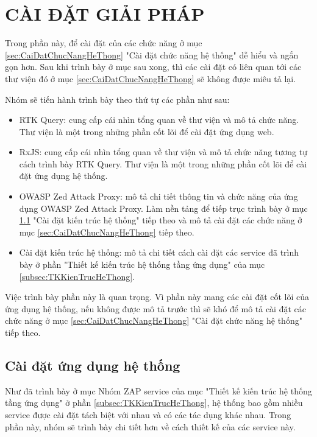 \chapter{CÀI ĐẶT GIẢI PHÁP}

\tab Trong phần này, để cài đặt của các chức năng ở mục \ref{sec:CaiDatChucNangHeThong} "Cài đặt chức năng hệ thống" dễ hiểu và ngắn gọn hơn.
Sau khi trình bày ở mục sau xong, thì các cài đặt có liên quan tới các thư viện đó ở mục \ref{sec:CaiDatChucNangHeThong} sẽ không được miêu tả lại.

Nhóm sẽ tiến hành trình bày theo thứ tự các phần như sau:
\begin{itemize}
  \item RTK Query: cung cấp cái nhìn tổng quan về thư viện và mô tả chức năng.
  Thư viện là một trong những phần cốt lõi để cài đặt ứng dụng web.
  \item RxJS: cung cấp cái nhìn tổng quan về thư viện và mô tả chức năng tương tự cách trình bày RTK Query.
  Thư viện là một trong những phần cốt lõi để cài đặt ứng dụng hệ thống.
  \item OWASP Zed Attack Proxy: mô tả chi tiết thông tin và chức năng của ứng dụng OWASP Zed Attack Proxy.
  Làm nền tảng để tiếp trục trình bày ở mục \ref{sec:CaiDatUngDungHeThong} "Cài đặt kiến trúc hệ thống" tiếp theo và mô tả cài đặt các chức năng ở mục \ref{sec:CaiDatChucNangHeThong} tiếp theo.
  \item Cài đặt kiến trúc hệ thống: mô tả chi tiết cách cài đặt các service đã trình bày ở phần "Thiết kế kiến trúc hệ thống tầng ứng dụng" của mục \ref{subsec:TKKienTrucHeThong}.
\end{itemize}

Việc trình bày phần này là quan trọng. Vì phần này mang các cài đặt cốt lõi của ứng dụng hệ thống, 
nếu không được mô tả trước thì sẽ khó để mô tả cài đặt các chức năng ở mục \ref{sec:CaiDatChucNangHeThong} "Cài đặt chức năng hệ thống" tiếp theo.

\section{Cài đặt ứng dụng hệ thống} \label{sec:CaiDatUngDungHeThong}

\tab Như đã trình bày ở mục Nhóm ZAP service của mục "Thiết kế kiến trúc hệ thống tầng ứng dụng" ở phần \ref{subsec:TKKienTrucHeThong}, hệ thống bao gồm nhiều service được cài đặt tách biệt với nhau và có các tác dụng khác nhau. Trong phần này, nhóm sẽ trình bày chi tiết hơn về cách thiết kế của các service này.

